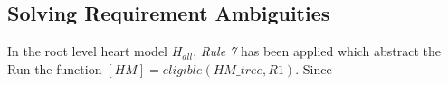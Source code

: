 \subsection{Solving Requirement Ambiguities}
In the root level heart model $H_{all}$, \emph{Rule 7} has been applied which abstract the 
Run the function $[HM]=eligible(HM\_tree,R1)$. Since 
%
 




